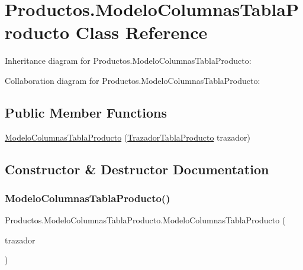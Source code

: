 \hypertarget{class_productos_1_1_modelo_columnas_tabla_producto}{}\section{Productos.\+Modelo\+Columnas\+Tabla\+Producto Class Reference}
\label{class_productos_1_1_modelo_columnas_tabla_producto}


Inheritance diagram for Productos.\+Modelo\+Columnas\+Tabla\+Producto\+:


Collaboration diagram for Productos.\+Modelo\+Columnas\+Tabla\+Producto\+:
\subsection*{Public Member Functions}
\begin{DoxyCompactItemize}
\item 
\mbox{\hyperlink{class_productos_1_1_modelo_columnas_tabla_producto_a241bca4777bb26a26f8c0bb78049f2b0}{Modelo\+Columnas\+Tabla\+Producto}} (\mbox{\hyperlink{class_productos_1_1_trazador_tabla_producto}{Trazador\+Tabla\+Producto}} trazador)
\end{DoxyCompactItemize}


\subsection{Constructor \& Destructor Documentation}
\mbox{\label{class_productos_1_1_modelo_columnas_tabla_producto_a241bca4777bb26a26f8c0bb78049f2b0}} 
\subsubsection{\texorpdfstring{Modelo\+Columnas\+Tabla\+Producto()}{ModeloColumnasTablaProducto()}}
{\footnotesize\ttfamily Productos.\+Modelo\+Columnas\+Tabla\+Producto.\+Modelo\+Columnas\+Tabla\+Producto (\begin{DoxyParamCaption}\item[{\mbox{\hyperlink{class_productos_1_1_trazador_tabla_producto}{Trazador\+Tabla\+Producto}}}]{trazador }\end{DoxyParamCaption})\hspace{0.3cm}{\ttfamily [inline]}}

